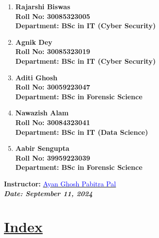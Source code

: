 \documentclass[a4paper,12pt]{article}
\begin{document}
\begin{titlepage}
    \normalsize
    \begin{enumerate}
        \item \textbf{Rajarshi Biswas}\\
              \textbf{Roll No: 30085323005}\\
              \textbf{Department: BSc in IT (Cyber Security)}
        \item \textbf{Agnik Dey}\\
              \textbf{Roll No: 30085323019}\\
              \textbf{Department: BSc in IT (Cyber Security)}
        \item \textbf{Aditi Ghosh}\\
              \textbf{Roll No: 30059223047}\\
              \textbf{Department: BSc in Forensic Science}
        \item \textbf{Nawazish Alam}\\
              \textbf{Roll No: 30084323041}\\
              \textbf{Department: BSc in IT (Data Science)}
              \item \textbf{Aabir Sengupta}\\
              \textbf{Roll No: 39959223039}\\
              \textbf{Department: BSc in Forensic Science}
    \end{enumerate}
    \vspace{0.5 cm}
    
    \textbf{Instructor:} \href{mailto:ayan.ghosh@university.edu}{\textcolor{blue}{Ayan Ghosh \text{\&} Pabitra Pal}}\\
    \textbf{\textit{Date: September 11, 2024}}

\end{titlepage}
\newpage
{}
\vspace{-2cm}

\centering
\section*{\underline{\Huge\textbf{\textcolor{blue!60}{Index}}}}
\vspace{0.5cm}
\end{document}
